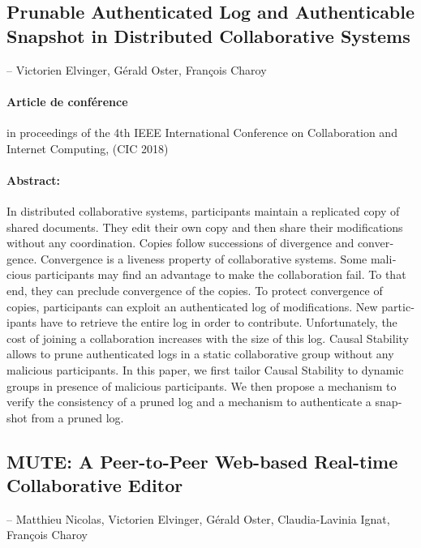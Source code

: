 \begin{otherlanguage}{english}
\subsection*{Prunable Authenticated Log and Authenticable Snapshot in Distributed Collaborative Systems \autocite{2018_elvinger_prunable-auth-log}}

-- Victorien Elvinger, Gérald Oster, François Charoy

\paragraph{Article de conférence} in proceedings of the 4th {IEEE} International Conference on Collaboration and Internet Computing, ({CIC} 2018)

\paragraph{Abstract:} In distributed collaborative systems, participants maintain a replicated copy of shared documents.
They edit their own copy and then share their modifications without any coordination.
Copies follow successions of divergence and convergence.
Convergence is a liveness property of collaborative systems.
Some malicious participants may find an advantage to make the collaboration fail. 
To that end, they can preclude convergence of the copies.
%
To protect convergence of copies, participants can exploit an authenticated log of modifications.
New participants have to retrieve the entire log in order to contribute. Unfortunately, the cost of joining a collaboration increases with the size of this log.
Causal Stability allows to prune authenticated logs in a static collaborative group without any malicious participants.
%
In this paper, we first tailor Causal Stability to dynamic groups in presence of malicious participants.
We then propose a mechanism to verify the consistency of a pruned log and a mechanism to authenticate a snapshot from a pruned log.

\bigskip
\bigskip

\subsection*{MUTE\@: A Peer-to-Peer Web-based Real-time Collaborative Editor \autocite{2017_nicolas-mute-demo}}

-- Matthieu Nicolas, Victorien Elvinger, Gérald Oster, Claudia-Lavinia Ignat,
François Charoy


\end{otherlanguage}
